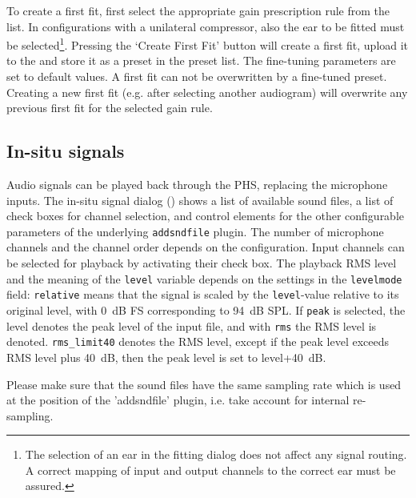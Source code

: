 \documentclass[11pt,a4paper,twoside]{article}
\newcommand{\+}{\discretionary{\mbox{\scriptsize$\hookleftarrow$}}{}{}}
\begin{document}
To create a first fit, first select the appropriate gain prescription
rule from the list. In \mha{} configurations with a unilateral
compressor, also the ear to be fitted must be selected\footnote{The
  selection of an ear in the fitting dialog does not affect any signal
  routing. A correct mapping of \mha{} input and output channels to the
  correct ear must be assured.}. Pressing the `Create First Fit'
button will create a first fit, upload it to the \mha{} and store it as a
preset in the preset list. The fine-tuning parameters are set to
default values.  A first fit can not be overwritten by a fine-tuned
preset.  Creating a new first fit (e.g. after selecting another
audiogram) will overwrite any previous first fit for the selected gain
rule.


\subsection{In-situ signals}\label{sec:insitu}

Audio signals can be played back through the PHS, replacing the
microphone inputs.
%
The in-situ signal dialog ()
shows a list of available sound files, a list of check boxes for
channel selection, and control elements for the other configurable
parameters of the underlying \verb!addsndfile! plugin.
%
The number of microphone channels and the channel order depends on the \mha{}
configuration.
%
Input channels can be selected for playback by activating their check
box.
%
The playback RMS level and the meaning of the \verb!level! variable
depends on the settings in the \verb!levelmode!  field:
\verb!relative! means that the signal is scaled by the
\verb!level!-value relative to its original level, with 0~dB FS
corresponding to 94~dB SPL. If \verb!peak! is selected, the level
denotes the peak level of the input file, and with \verb!rms! the RMS
level is denoted. \verb!rms_limit40! denotes the RMS level, except if
the peak level exceeds RMS level plus 40~dB, then the peak level is
set to level+40~dB.

Please make sure that the sound files have the same sampling rate
which is used at the position of the 'addsndfile' plugin, i.e. take
account for internal re-sampling.

\end{document}
